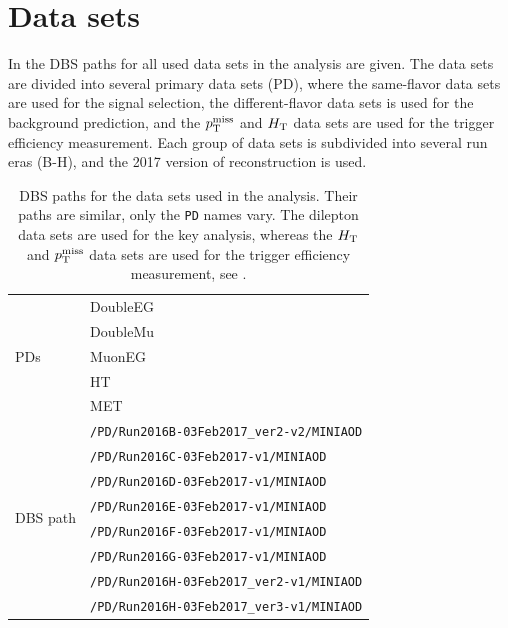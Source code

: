 \chapter{Data sets}
In  the DBS paths for all used data sets in the analysis are given. The data sets are divided into several primary data sets (PD), where the same-flavor data sets are used for the signal selection, the different-flavor data sets is used for the background prediction, and the $p_{\mathrm{T}}^\text{miss}$ and $H_{\mathrm{T}}$ data sets are used for the trigger efficiency measurement. Each group of data sets is subdivided into several run eras (B-H), and the 2017 version of reconstruction is used.

\begin{table}[htb]
 \centering
 \caption{DBS paths for the data sets used in the analysis. Their paths are similar, only the \texttt{PD} names vary. The dilepton data sets are used for the key analysis, whereas the $H_{\mathrm{T}}$ and $p_{\mathrm{T}}^\text{miss}$ data sets are used for the trigger efficiency measurement, see .}
 \label{tab:app_datasets}
 \begin{tabular}{l|l}
  \hline
  \multirow{5}{*}{PDs}       & DoubleEG               \\
                             & DoubleMu               \\
                             & MuonEG                 \\
                             & HT                     \\
                             & MET                    \\\hline\hline
  \multirow{ 9}{*}{DBS path} & \verb|/PD/Run2016B-03Feb2017_ver2-v2/MINIAOD| \\
                             & \verb|/PD/Run2016C-03Feb2017-v1/MINIAOD| \\
                             & \verb|/PD/Run2016D-03Feb2017-v1/MINIAOD| \\
                             & \verb|/PD/Run2016E-03Feb2017-v1/MINIAOD| \\
                             & \verb|/PD/Run2016F-03Feb2017-v1/MINIAOD| \\
                             & \verb|/PD/Run2016G-03Feb2017-v1/MINIAOD| \\
                             & \verb|/PD/Run2016H-03Feb2017_ver2-v1/MINIAOD| \\
                             & \verb|/PD/Run2016H-03Feb2017_ver3-v1/MINIAOD| \\
  \hline
 \end{tabular}
\end{table}

